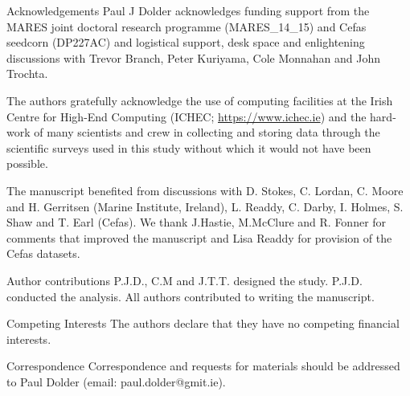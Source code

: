 \documentclass{nature}
\begin{document}

\begin{addendum}
 \item [Acknowledgements] Paul J Dolder acknowledges funding support
	 from the MARES joint doctoral research programme (MARES\_14\_15) and
	 Cefas seedcorn (DP227AC) and logistical support, desk space and
	 enlightening discussions with Trevor Branch, Peter Kuriyama, Cole
	 Monnahan and John Trochta.
	 
	 The authors gratefully acknowledge the use of computing facilities at
	 the Irish Centre for High-End Computing (ICHEC;
	 \url{https://www.ichec.ie}) and the hard-work of many scientists and
	 crew in collecting and storing data through the scientific surveys
	 used in this study without which it would not have been possible.  

	 The manuscript benefited from discussions with D. Stokes, C.  Lordan,
	 C. Moore and H. Gerritsen (Marine Institute, Ireland), L.  Readdy, C.
	 Darby, I. Holmes, S. Shaw and T. Earl (Cefas). We thank J.Hastie,
	 M.McClure and R. Fonner for comments that improved the manuscript and
	 Lisa Readdy for provision of the Cefas datasets.

 \item[Author contributions] P.J.D., C.M and J.T.T. designed the study. P.J.D.
	 conducted the analysis. All authors contributed to writing the
	 manuscript.  


 \item[Competing Interests] The authors declare that they have
	 no competing financial interests.
 \item[Correspondence] Correspondence and requests for materials
 should be addressed to Paul Dolder (email: paul.dolder@gmit.ie).
 \end{addendum}


\end{document}
